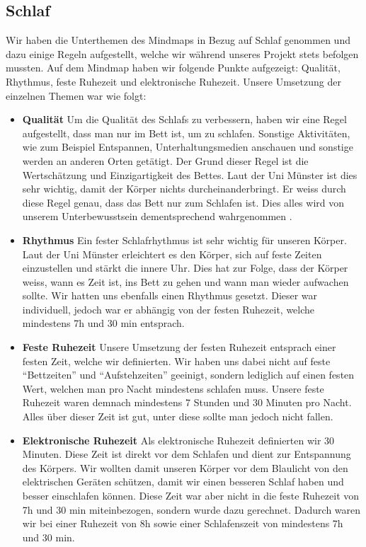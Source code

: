 \subsection{Schlaf}
\authortoc{\bastian}{\subsectionident}
Wir haben die Unterthemen des Mindmaps in Bezug auf Schlaf genommen und dazu einige Regeln aufgestellt, welche wir während unseres Projekt stets befolgen mussten.
\newline
Auf dem Mindmap haben wir folgende Punkte aufgezeigt: Qualität, Rhythmus, feste Ruhezeit und elektronische Ruhezeit. 
\newline
\newline
Unsere Umsetzung der einzelnen Themen war wie folgt:
\begin{itemize}
  \item \textbf{Qualität}
  \newline
  Um die Qualität des Schlafs zu verbessern, haben wir eine Regel aufgestellt, dass man nur im Bett ist, um zu schlafen. Sonstige Aktivitäten, wie zum Beispiel Entspannen, Unterhaltungsmedien anschauen und sonstige werden an anderen Orten getätigt. Der Grund dieser Regel ist die Wertschätzung und Einzigartigkeit des Bettes. Laut der Uni Münster ist dies sehr wichtig, damit der Körper nichts durcheinanderbringt. Er weiss durch diese Regel genau, dass das Bett nur zum Schlafen ist. Dies alles wird von unserem Unterbewusstsein dementsprechend wahrgenommen \cite{schlaf_regeln}.
  \item \textbf{Rhythmus}
  \newline
  Ein fester Schlafrhythmus ist sehr wichtig für unseren Körper. Laut der Uni Münster erleichtert es den Körper, sich auf feste Zeiten einzustellen und stärkt die innere Uhr. Dies hat zur Folge, dass der Körper weiss, wann es Zeit ist, ins Bett zu gehen und wann man wieder aufwachen sollte. Wir hatten uns ebenfalls einen Rhythmus gesetzt. Dieser war individuell, jedoch war er abhängig von der festen Ruhezeit, welche mindestens 7h und 30 min entsprach.
  \item \textbf{Feste Ruhezeit}
  \newline
  Unsere Umsetzung der festen Ruhezeit entsprach einer festen Zeit, welche wir definierten. Wir haben uns dabei nicht auf feste “Bettzeiten” und “Aufstehzeiten” geeinigt, sondern lediglich auf einen festen Wert, welchen man pro Nacht mindestens schlafen muss. Unsere feste Ruhezeit waren demnach mindestens 7 Stunden und 30 Minuten pro Nacht. Alles über dieser Zeit ist gut, unter diese sollte man jedoch nicht fallen.
  \item \textbf{Elektronische Ruhezeit}
  \newline
  Als elektronische Ruhezeit definierten wir 30 Minuten. Diese Zeit ist direkt vor dem Schlafen und dient zur Entspannung des Körpers. Wir wollten damit unseren Körper vor dem Blaulicht von den elektrischen Geräten schützen, damit wir einen besseren Schlaf haben und besser einschlafen können. Diese Zeit war aber nicht in die feste Ruhezeit von 7h und 30 min miteinbezogen, sondern wurde dazu gerechnet. Dadurch waren wir bei einer Ruhezeit von 8h sowie einer Schlafenszeit von mindestens 7h und 30 min.
\end{itemize}
